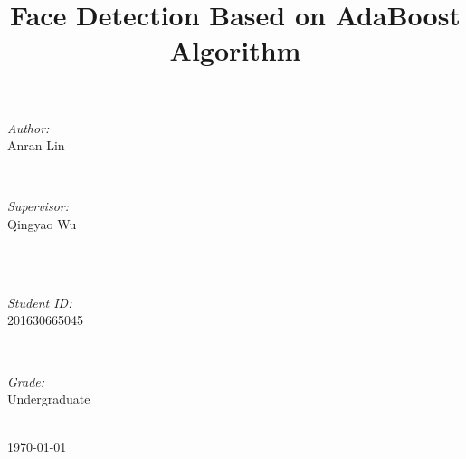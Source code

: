 \documentclass[journal, a4paper]{IEEEtran}
\begin{document}
\begin{titlepage}
\begin{minipage}{0.4\textwidth}
\begin{flushleft} \large
\emph{Author:}\\
Anran Lin %
\end{flushleft}
\end{minipage}
~
\begin{minipage}{0.4\textwidth}
\begin{flushright} \large
\emph{Supervisor:} \\
Qingyao Wu %
\end{flushright}
\end{minipage}\\[2cm]
~
\begin{minipage}{0.4\textwidth}
\begin{flushleft} \large
\emph{Student ID:}\\
201630665045
\end{flushleft}
\end{minipage}
~
\begin{minipage}{0.4\textwidth}
\begin{flushright} \large
\emph{Grade:} \\
Undergraduate
\end{flushright}
\end{minipage}\\[2cm]



{\large \today}\\[2cm] %

 

\vfill %

\end{titlepage}

	\title{Face Detection Based on AdaBoost Algorithm}
	\maketitle
\end{document}
